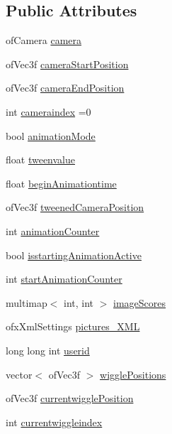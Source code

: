 \subsection*{Public Attributes}
\begin{DoxyCompactItemize}
\item 
of\-Camera \hyperlink{classtest_app_a0278ee237cbbd881252d6273b131bb55}{camera}
\item 
of\-Vec3f \hyperlink{classtest_app_ac01013264b9988207e7fd9e0a486ff2f}{camera\-Start\-Position}
\item 
of\-Vec3f \hyperlink{classtest_app_ad3319d9cd3cb00e898f4f602b879efad}{camera\-End\-Position}
\item 
int \hyperlink{classtest_app_a4ca3a51642dedbf37f2b9f6ef96510c7}{cameraindex} =0
\item 
bool \hyperlink{classtest_app_a2a5d49fd1f7f50f745f56095a1fa0099}{animation\-Mode}
\item 
float \hyperlink{classtest_app_add9ab1aa902948afbdf1c6db0dfde385}{tweenvalue}
\item 
float \hyperlink{classtest_app_adcaa52132409ab0ad077236f9e6fa180}{begin\-Animationtime}
\item 
of\-Vec3f \hyperlink{classtest_app_ae9f60797c1c5d9f1ac06e1d6a5259957}{tweened\-Camera\-Position}
\item 
int \hyperlink{classtest_app_a21b16bdba744425519597fcb925df43a}{animation\-Counter}
\item 
bool \hyperlink{classtest_app_ab8a277e1055730fb5d6786ce0c4804b2}{isstarting\-Animation\-Active}
\item 
int \hyperlink{classtest_app_a577bf117cf10109de967ea0d3ca17f1f}{start\-Animation\-Counter}
\item 
multimap$<$ int, int $>$ \hyperlink{classtest_app_a9ced1a64554a911109fe8a975b95b590}{image\-Scores}
\item 
ofx\-Xml\-Settings \hyperlink{classtest_app_a85133f49103cfa002f39d882f7168236}{pictures\-\_\-\-X\-M\-L}
\item 
long long int \hyperlink{classtest_app_a6ae76dc97fbeee00755f4a6cd6b87e19}{userid}
\item 
vector$<$ of\-Vec3f $>$ \hyperlink{classtest_app_a5495d37f44bb3e3b00a04ad5910e0a6b}{wiggle\-Positions}
\item 
of\-Vec3f \hyperlink{classtest_app_af81358868ae15faab1974ec074b1509f}{currentwiggle\-Position}
\item 
int \hyperlink{classtest_app_a6b9af0b1ae4a2c0530eb6a8cf8340751}{currentwiggleindex}
\item 

\end{DoxyCompactItemize}
